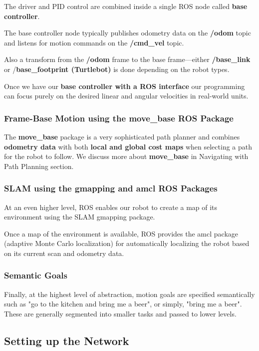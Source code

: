 \documentclass[10pt,a4paper]{article}
\begin{document}
The driver and PID control are combined inside a single ROS node called \textbf{base controller}. 

The base controller node typically publishes odometry data on the \textbf{/odom }topic and listens for motion commands on the \textbf{/cmd\_vel} topic.

Also a transform from the \textbf{/odom} frame to the base frame—either \textbf{/base\_link} or /\textbf{base\_footprint (Turtlebot)} is done depending on the robot types.

Once we have our \textbf{base controller with a ROS interface} our programming can focus purely on the desired linear and angular velocities in real-world units.

\subsubsection{Frame-Base Motion using the move\_base ROS Package}
The \textbf{move\_base} package is a very sophisticated path planner and combines \textbf{odometry data} with both \textbf{local and global cost maps }when selecting a path for the robot to follow. We discuss more about \textbf{move\_base} in Navigating with Path Planning section.

\subsubsection{SLAM using the gmapping and amcl ROS Packages}
At an even higher level, ROS enables our robot to create a map of its environment using the SLAM gmapping package.

Once a map of the environment is available, ROS provides the amcl package (adaptive Monte Carlo localization) for automatically localizing the robot based on its current scan and odometry data.

\subsubsection{Semantic Goals}
Finally, at the highest level of abstraction, motion goals are specified semantically such as "go to the kitchen and bring me a beer", or simply, "bring me a beer". These are generally segmented into smaller tasks and passed to lower levels.

\subsection{Setting up the Network}
\end{document}
